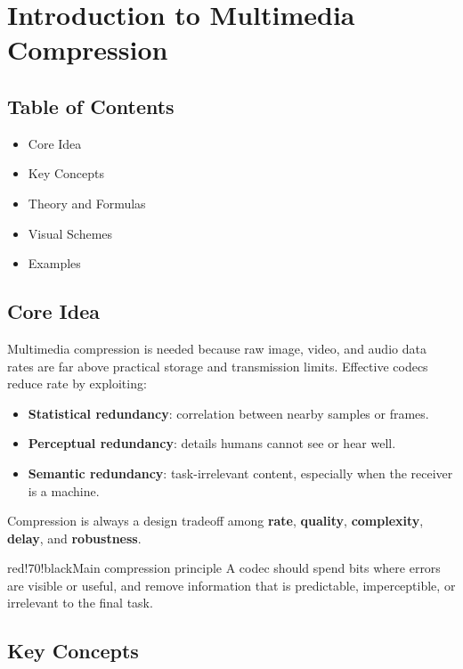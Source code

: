 \chapter{Introduction to Multimedia Compression}

\section{Table of Contents}

\begin{itemize}
  \item Core Idea
  \item Key Concepts
  \item Theory and Formulas
  \item Visual Schemes
  \item Examples
\end{itemize}

\section{Core Idea}

Multimedia compression is needed because raw image, video, and audio data rates are far above practical storage and transmission limits. Effective codecs reduce rate by exploiting:

\begin{itemize}
  \item \textbf{Statistical redundancy}: correlation between nearby samples or frames.
  \item \textbf{Perceptual redundancy}: details humans cannot see or hear well.
  \item \textbf{Semantic redundancy}: task-irrelevant content, especially when the receiver is a machine.
\end{itemize}

Compression is always a design tradeoff among \textbf{rate}, \textbf{quality}, \textbf{complexity}, \textbf{delay}, and \textbf{robustness}.

\begin{calloutbox}{red!70!black}{Main compression principle}
A codec should spend bits where errors are visible or useful, and remove information that is predictable, imperceptible, or irrelevant to the final task.
\end{calloutbox}

\section{Key Concepts}

